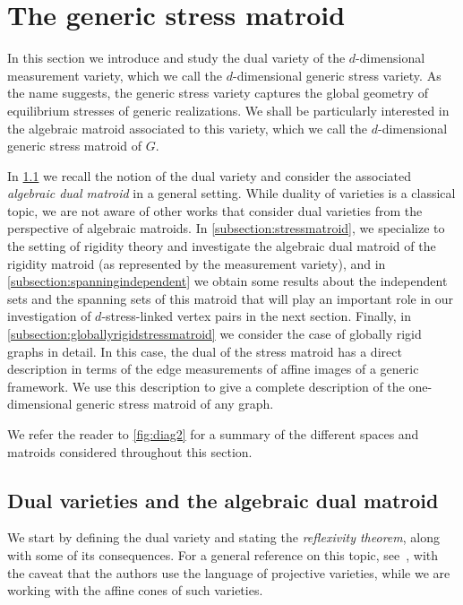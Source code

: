 \documentclass[11pt,a4paper,dvipsnames]{scrartcl}
\theoremstyle{definition}
\newcommand{\strongly}[1]{${#1}$-stress-linked}
\begin{document}
\section{The generic stress matroid}\label{section:genericstressmatroid}

In this section we introduce and study the dual variety of the $d$-dimensional measurement variety, which we call the $d$-dimensional generic stress variety. As the name suggests, the generic stress variety captures the global geometry of equilibrium stresses of generic realizations. We shall be particularly interested in the algebraic matroid associated to this variety, which we call the $d$-dimensional generic stress matroid of $G$. 

In \cref{subsection:algebraicdual} we recall the notion of the dual variety and consider the associated \emph{algebraic dual matroid} in a general setting. While duality of varieties is a classical topic, we are not aware of other works that consider dual varieties from the perspective of algebraic matroids. In \cref{subsection:stressmatroid}, we specialize to the setting of rigidity theory and investigate the algebraic dual matroid of the rigidity matroid (as represented by the measurement variety), and in \cref{subsection:spanningindependent} we obtain some results about the independent sets and the spanning sets of this matroid that will play an important role in our investigation of \strongly{d} vertex pairs in the next section. Finally, in \cref{subsection:globallyrigidstressmatroid} we consider the case of globally rigid graphs in detail. In this case, the dual of the stress matroid has a direct description in terms of the edge measurements of affine images of a generic framework. We use this description to give a complete description of the one-dimensional generic stress matroid of any graph.

We refer the reader to \cref{fig:diag2} for a summary of the different spaces and matroids considered throughout this section. 


\subsection{Dual varieties and the algebraic dual matroid}\label{subsection:algebraicdual}

We start by defining the dual variety and stating the \emph{reflexivity theorem}, along with some of its consequences. For a general reference on this topic, see~\cite[Chapter 2]{fischer.piontkowski_2001}, with the caveat that the authors use the language of projective varieties, while we are working with the affine cones of such varieties.
\end{document}
